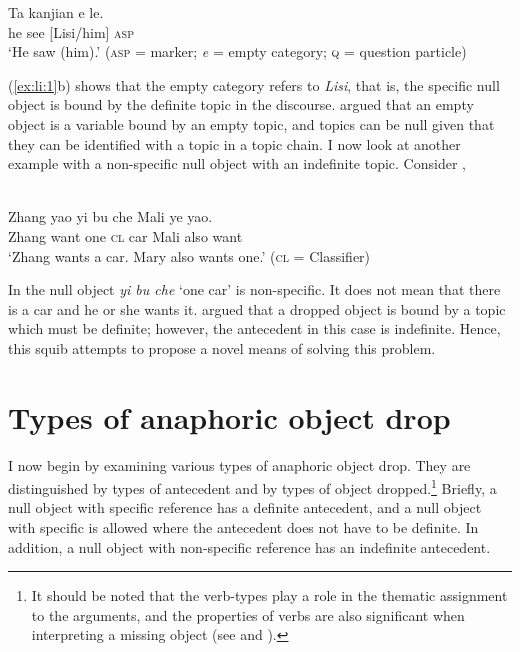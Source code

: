 \documentclass[output=paper]{LSP/langsci}
\begin{document}
\ex
\gll  Ta kanjian     e   le. \\
  he see          [Lisi/him] \textsc{asp}    \\
\glt ‘He saw (him).’    (\textsc{asp} =  marker; \textit{e} = empty category; \textsc{q} = question particle)
\z
\z



(\ref{ex:li:1}b) shows that the empty category refers to \textit{Lisi}, that is, the specific null object is bound by the definite topic in the discourse. \citet{Huang1982,Huang1984,Huang1989} argued that an empty object is a variable bound by an empty topic, and topics can be null given that they can be identified with a topic in a topic chain. I now look at another example with a non-specific null object with an indefinite topic. Consider ,


\ea%
\label{ex:li:2}
\\
\gll Zhang  yao   yi  bu   che     Mali   ye   yao.      \\
  Zhang  want   one \textsc{cl}  car     Mali   also   want    \\
\glt `Zhang wants a car.  Mary also wants one.'  (\textsc{cl} = Classifier)
\z



In  the null object \textit{yi bu che} ‘one car’ is non-specific. It does not mean that there is a car and he or she wants it. \citet{Huang1984} argued that a dropped object is bound by a topic which must be definite; however, the antecedent in this case is indefinite. Hence, this squib attempts to propose a novel means of solving this problem.


\section{Types of anaphoric object drop}


I now begin by examining various types of anaphoric object drop. They are distinguished by types of antecedent and by types of object dropped.\footnote{It should be noted that the verb-types play a role in the thematic assignment to the arguments, and the  properties of verbs are also significant when interpreting a missing object (see \citealt{HuangEtAl2009} and \citealt{LiWei2014}).} Briefly, a null object with specific reference has a definite antecedent, and a null object with specific  is allowed where the antecedent does not have to be definite. In addition, a null object with non-specific reference has an indefinite antecedent.
\end{document}
